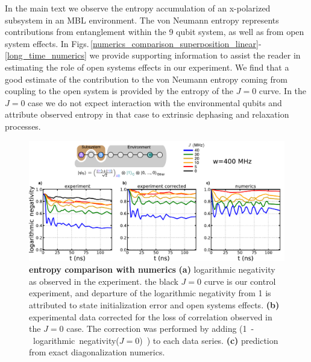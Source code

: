 In the main text we observe the entropy accumulation of an x-polarized subsystem in an MBL environment.
The von Neumann entropy represents contributions from entanglement within the 9 qubit system, as well as from open system effects.  In Figs.\,\ref{numerics_comparison_superposition_linear}-\ref{long_time_numerics} we provide supporting information to assist the reader in estimating the role of open systems effects in our experiment.  We find that a good estimate of the contribution to the von Neumann entropy coming from coupling to the open system is provided by the entropy of the $J=0$ curve.  In the $J=0$ case we do not expect interaction with the environmental qubits and attribute observed entropy in that case to extrinsic dephasing and relaxation processes.

\begin{figure}[tbh]
\centering
\includegraphics[width=140mm, keepaspectratio]{./PDF/dat_cor_num_bell_linear.pdf}
\caption{\textbf{entropy comparison with numerics}
\footnotesize{
\textbf{(a)} logarithmic negativity as observed in the experiment.
the black $J=0$ curve is our control experiment, and departure of the logarithmic negativity from 1 is attributed to state initialization error and open systems effects.
\textbf{(b)} experimental data corrected for the loss of correlation observed in the $J=0$ case.  The correction was performed by adding \mbox{(1 - logarithmic negativity($J=0$) )} to each data series.
\textbf{(c)} prediction from exact diagonalization numerics.
}
}
\label{numerics_comparison_bell_linear}
\end{figure}

